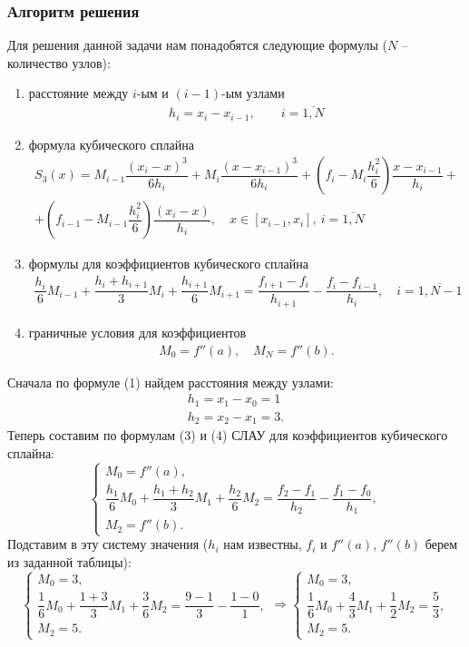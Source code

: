 \documentclass[a4paper, 12pt]{article}
\begin{document}
	\subsubsection*{Алгоритм решения}
		Для решения данной задачи нам понадобятся следующие формулы ($N$ -- количество узлов):\begin{enumerate}
		\item расстояние между $i$-ым и $(i-1)$-ым узлами \begin{eqnarray}
			h_i=x_i - x_{i-1},\qquad i=\overline{1,N}\label{1}
		\end{eqnarray}
		\item формула кубического сплайна\begin{multline}
			S_3(x) = M_{i-1}\dfrac{(x_i - x)^3}{6h_i} + M_{i}\dfrac{(x-x_{i-1})^3}{6h_i} + \left(f_i - M_i\dfrac{h_i^2}{6}\right)\dfrac{x-x_{i-1}}{h_i} +\\+ \left(f_{i-1} - M_{i-1}\dfrac{h_i^2}{6}\right)\dfrac{(x_i - x)}{h_i},\quad x\in [x_{i-1}, x_i],\ i = \overline{1,N}
		\end{multline}
		\item формулы для коэффициентов кубического сплайна
		\begin{multline}
			\dfrac{h_i}{6}M_{i-1} + \dfrac{h_i + h_{i+1}}{3}M_i + \dfrac{h_{i+1}}{6}M_{i+1} = \dfrac{f_{i+1} - f_i}{h_{i+1}} - \dfrac{f_i - f_{i-1}}{h_i},\quad i = \overline {1,N-1}
		\end{multline}
		\item граничные условия для коэффициентов \begin{eqnarray}
			M_0 = f''(a),\quad M_N = f''(b).
		\end{eqnarray}
	\end{enumerate}
	Сначала по формуле (1) найдем расстояния между узлами:
	$$\begin{matrix}
		h_1 = x_1 - x_0 = 1\\
		h_2 = x_2 - x_1 = 3.
	\end{matrix}$$
	Теперь составим по формулам (3) и (4) СЛАУ для коэффициентов кубического сплайна:
	$$\begin{cases}
		M_0 = f''(a),\\
		\dfrac{h_1}{6}M_{0} + \dfrac{h_1 + h_{2}}{3}M_1 + \dfrac{h_{2}}{6}M_{2} = \dfrac{f_{2} - f_1}{h_{2}} - \dfrac{f_1 - f_{0}}{h_1},\\
		M_2 = f''(b).
	\end{cases}$$
	Подставим в эту систему значения ($h_i$ нам известны, $f_i$ и $f''(a)$, $f''(b)$ берем из заданной таблицы):
	$$\begin{cases}
		M_0 = 3,\\
		\dfrac{1}{6}M_{0} + \dfrac{1+3}{3}M_1 + \dfrac{3}{6}M_{2} = \dfrac{9 -1}{3} - \dfrac{1 - 0}{1},\\
		M_2=5.
	\end{cases}
	\Rightarrow 
	\begin{cases}
		M_0 = 3,\\
		\dfrac{1}{6}M_{0} + \dfrac43M_1 + \dfrac{1}{2}M_{2} = \dfrac53,\\
		M_{2}=5.
	\end{cases}$$
\end{document}
